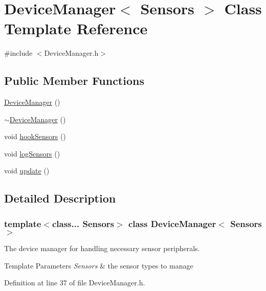 \hypertarget{classDeviceManager}{}\section{Device\+Manager$<$ Sensors $>$ Class Template Reference}
\label{classDeviceManager}


{\ttfamily \#include $<$Device\+Manager.\+h$>$}

\subsection*{Public Member Functions}
\begin{DoxyCompactItemize}
\item 
\mbox{\hyperlink{classDeviceManager_ac7804420230626193b647f3744d80d7f}{Device\+Manager}} ()
\item 
\mbox{\hyperlink{classDeviceManager_a750e88a618d6625436094c53ff9f22a8}{$\sim$\+Device\+Manager}} ()
\item 
void \mbox{\hyperlink{classDeviceManager_a73b4335c01ea2cea4981fec5f46d3406}{hook\+Sensors}} ()
\item 
void \mbox{\hyperlink{classDeviceManager_a171961019173e8ac7f6cb2a9a264aac0}{log\+Sensors}} ()
\item 
void \mbox{\hyperlink{classDeviceManager_a09e0614a93d32e8087d3dca0dc4e705e}{update}} ()
\end{DoxyCompactItemize}


\subsection{Detailed Description}
\subsubsection*{template$<$class... Sensors$>$\newline
class Device\+Manager$<$ Sensors $>$}

The device manager for handling necessary sensor peripherals.


\begin{DoxyTemplParams}{Template Parameters}
{\em Sensors} & the sensor types to manage \\
\hline
\end{DoxyTemplParams}


Definition at line 37 of file Device\+Manager.\+h.



